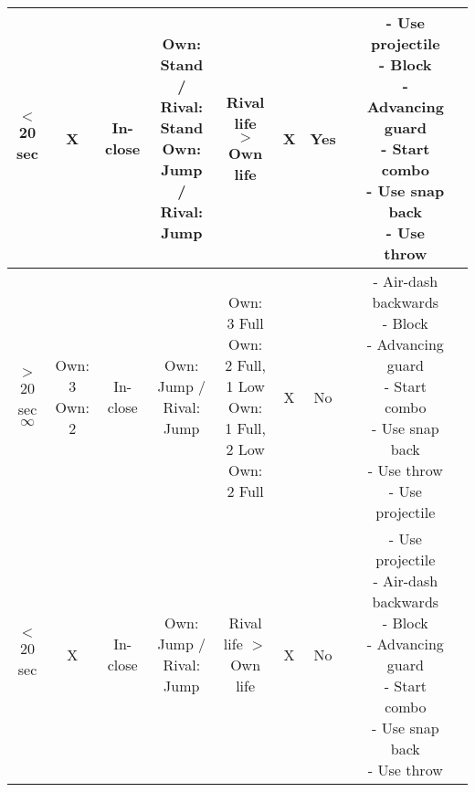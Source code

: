 \documentclass{article}
\begin{document}
\begin{landscape}
\begin{table}[h!]
\begin{center}
\begin{tabular*}{24cm}{c|c|c|c|c|c|c|c|c|c}
      \hline
      $<$ 20 sec & X & In-close & \makecell{Own: Stand / Rival: Stand \\ Own: Jump / Rival: Jump} & Rival life $>$ Own life & X & Yes & & \makecell{- Use projectile \\ - Block \\ - Advancing guard \\ - Start combo \\ - Use snap back \\ - Use throw}\\
      \hline
      \makecell{$>$ 20 sec \\ $\infty$} & \makecell {Own: 3 \\ Own: 2} & In-close & Own: Jump / Rival: Jump & \makecell {Own: 3 Full \\ Own: 2 Full, 1 Low \\ Own: 1 Full, 2 Low \\ Own: 2 Full} & X & No & & \makecell{- Air-dash backwards \\ - Block \\ - Advancing guard \\ - Start combo \\ - Use snap back \\ - Use throw \\ - Use projectile}\\
      \hline
      $<$ 20 sec & X & In-close & Own: Jump / Rival: Jump & Rival life $>$ Own life & X & No & & \makecell{- Use projectile \\ - Air-dash backwards \\ - Block \\ - Advancing guard \\ - Start combo \\ - Use snap back \\ - Use throw}\\
      \hline
      \end{tabular*}
  \end{center}
\end{table}

\end{landscape}
    
\end{document}

